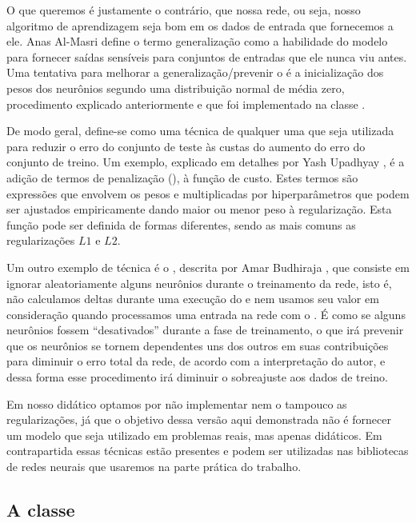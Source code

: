 O que queremos é justamente o contrário, que nossa rede, ou seja, nosso algoritmo de aprendizagem seja bom em  os dados de entrada que fornecemos a ele. Anas Al-Masri \citep{network_1} define o termo generalização como a habilidade do modelo para fornecer saídas sensíveis para conjuntos de entradas que ele nunca viu antes. Uma tentativa para melhorar a generalização/prevenir o  é a inicialização dos pesos dos neurônios segundo uma distribuição normal de média zero, procedimento explicado anteriormente e que foi implementado na classe .

De modo geral, define-se como uma técnica de  qualquer uma que seja utilizada para reduzir o erro do conjunto de teste às custas do aumento do erro do conjunto de treino. Um exemplo, explicado em detalhes por Yash Upadhyay \citep{yash}, é a adição de termos de penalização (), à função de custo. Estes termos são expressões que envolvem os pesos e multiplicadas por hiperparâmetros que podem ser ajustados empiricamente dando maior ou menor peso à regularização. Esta função pode ser definida de formas diferentes, sendo as mais comuns as regularizações $L1$ e $L2$.

Um outro exemplo de técnica é o , descrita por Amar Budhiraja \citep{network_2}, que consiste em ignorar aleatoriamente alguns neurônios durante o treinamento da rede, isto é, não calculamos deltas durante uma execução do  e nem usamos seu valor em consideração quando processamos uma entrada na rede com o . É como se alguns neurônios fossem ``desativados'' durante a fase de treinamento, o que irá prevenir que os neurônios se tornem dependentes uns dos outros em suas contribuições para diminuir o erro total da rede, de acordo com a interpretação do autor, e dessa forma esse procedimento irá diminuir o sobreajuste aos dados de treino.

Em nosso  didático optamos por não implementar nem o  tampouco as regularizações, já que o objetivo dessa versão aqui demonstrada não é fornecer um modelo que seja utilizado em problemas reais, mas apenas didáticos. Em contrapartida essas técnicas estão presentes e podem ser utilizadas nas bibliotecas de redes neurais que usaremos na parte prática do trabalho.

\subsection{A classe }
\label{secao:perceptron}

